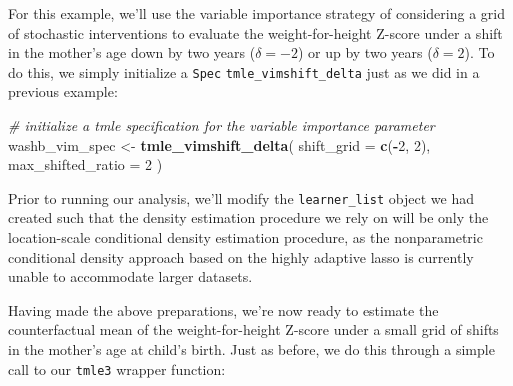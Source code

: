 \documentclass[12pt, krantz2,]{krantz}
\newenvironment{Shaded}{\begin{snugshade}}{\end{snugshade}}
\newcommand{\CommentTok}[1]{\textcolor[rgb]{0.37,0.37,0.37}{\textit{#1}}}
\newcommand{\DataTypeTok}[1]{\textcolor[rgb]{0.27,0.27,0.27}{#1}}
\newcommand{\DecValTok}[1]{\textcolor[rgb]{0.06,0.06,0.06}{#1}}
\newcommand{\KeywordTok}[1]{\textcolor[rgb]{0.27,0.27,0.27}{\textbf{#1}}}
\newcommand{\NormalTok}[1]{#1}
\newcommand{\OperatorTok}[1]{\textcolor[rgb]{0.43,0.43,0.43}{\textbf{#1}}}
\newcommand{\OtherTok}[1]{\textcolor[rgb]{0.37,0.37,0.37}{#1}}
\newcommand{\StringTok}[1]{\textcolor[rgb]{0.5,0.5,0.5}{#1}}
\theoremstyle{definition}
\theoremstyle{definition}
\theoremstyle{definition}
\newcommand{\1}{\mathbbm{1}}
\begin{document}
For this example, we'll use the variable importance strategy of considering a
grid of stochastic interventions to evaluate the weight-for-height Z-score under
a shift in the mother's age down by two years (\(\delta = -2\)) or up by two years
(\(\delta = 2\)). To do this, we simply initialize a \texttt{Spec} \texttt{tmle\_vimshift\_delta}
just as we did in a previous example:

\begin{Shaded}
\begin{Highlighting}[]
\CommentTok{# initialize a tmle specification for the variable importance parameter}
\NormalTok{washb_vim_spec <-}\StringTok{ }\KeywordTok{tmle_vimshift_delta}\NormalTok{(}
  \DataTypeTok{shift_grid =} \KeywordTok{c}\NormalTok{(}\OperatorTok{-}\DecValTok{2}\NormalTok{, }\DecValTok{2}\NormalTok{),}
  \DataTypeTok{max_shifted_ratio =} \DecValTok{2}
\NormalTok{)}
\end{Highlighting}
\end{Shaded}

Prior to running our analysis, we'll modify the \texttt{learner\_list} object we had
created such that the density estimation procedure we rely on will be only the
location-scale conditional density estimation procedure, as the nonparametric
conditional density approach based on the highly adaptive lasso \citep{diaz2011super, benkeser2016hal, coyle2020hal9001, hejazi2020hal9001, hejazi2020haldensify}
is currently unable to accommodate larger datasets.

\begin{Shaded}
\end{Shaded}

Having made the above preparations, we're now ready to estimate the
counterfactual mean of the weight-for-height Z-score under a small grid of
shifts in the mother's age at child's birth. Just as before, we do this through
a simple call to our \texttt{tmle3} wrapper function:
\end{document}
